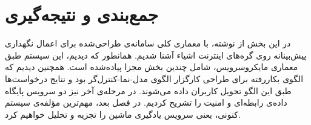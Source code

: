 \section{جمع‌بندی و نتیجه‌گیری}
در این بخش از نوشته، با معماری کلی سامانه‌ی طراحی‌شده برای اعمال نگهداری پیش‌بینانه روی گره‌های اینترنت اشیاء آشنا شدیم. همانطور که دیدیم، این سیستم طبق معماری مایکروسرویس، شامل چندین بخش مجزا پیاده‌شده است. همچنین دیدیم که الگوی بکار‌رفته برای طراحی کارگزار الگوی مدل-نما-کنترل‌گر بود و نتایج درخواست‌ها طبق این الگو تحویل کاربران داده می‌شوند. در مرحله‌ی آخر نیز دو سرویس پایگاه داده‌ی رابطه‌ای و امنیت را تشریح کردیم. در فصل بعد، مهم‌ترین مؤلفه‌ی سیستم کنونی، یعنی سرویس یادگیری ماشین را تجزیه و تحلیل خواهیم کرد.